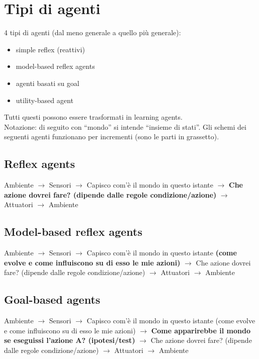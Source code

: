 \newpage

\section{Tipi di agenti}

4 tipi di agenti (dal meno generale a quello più generale):

\begin{itemize}
 \item simple reflex (reattivi)
 \item model-based reflex agents
 \item agenti basati su goal
 \item utility-based agent
\end{itemize}

Tutti questi possono essere trasformati in learning agents.\\

Notazione: di seguito con ``mondo'' si intende ``insieme di stati''. Gli schemi
dei seguenti agenti funzionano per incrementi (sono le parti in grassetto).

\subsection{Reflex agents}

Ambiente $\rightarrow$ Sensori $\rightarrow$ Capisco com'è il mondo in questo
istante $\rightarrow$ \textbf{Che azione dovrei fare? (dipende dalle regole
condizione/azione)} $\rightarrow$ Attuatori $\rightarrow$ Ambiente

\subsection{Model-based reflex agents}

Ambiente $\rightarrow$ Sensori $\rightarrow$ Capisco com'è il mondo in
questo istante \textbf{(come evolve e come influiscono su di esso le mie
azioni)} $\rightarrow$ Che azione dovrei fare? (dipende dalle regole
condizione/azione) $\rightarrow$ Attuatori $\rightarrow$ Ambiente

\subsection{Goal-based agents}

Ambiente $\rightarrow$ Sensori $\rightarrow$ Capisco com'è il mondo in questo
istante (come evolve e come influiscono su di esso le mie azioni) $\rightarrow$
\textbf{Come apparirebbe il mondo se eseguissi l'azione A? (ipotesi/test)}
$\rightarrow$ Che azione dovrei fare? (dipende dalle regole condizione/azione)
$\rightarrow$ Attuatori $\rightarrow$ Ambiente

